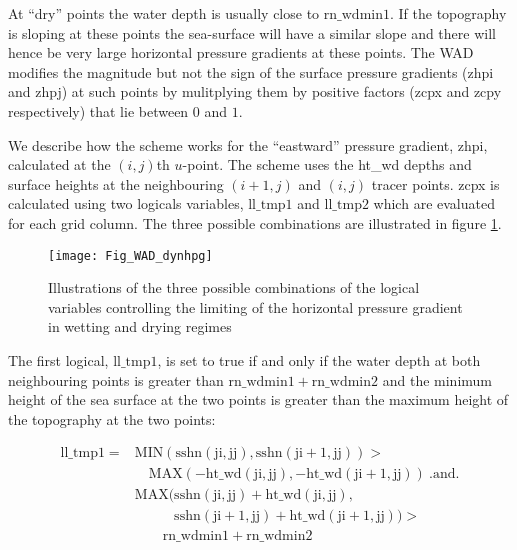 \documentclass[../main/NEMO_manual]{subfiles}
\begin{document}
At ``dry'' points the water depth is usually close to $\mathrm{rn\_wdmin1}$. If the
topography is sloping at these points the sea-surface will have a similar slope and there
will hence be very large horizontal pressure gradients at these points. The WAD modifies
the magnitude but not the sign of the surface pressure gradients (zhpi and zhpj) at such
points by mulitplying them by positive factors (zcpx and zcpy respectively) that lie
between $0$ and $1$.

We describe how the scheme works for the ``eastward'' pressure gradient, zhpi, calculated
at the $(i,j)$th $u$-point. The scheme uses the ht\_wd depths and surface heights at the
neighbouring $(i+1,j)$ and $(i,j)$ tracer points.  zcpx is calculated using two logicals
variables, $\mathrm{ll\_tmp1}$ and $\mathrm{ll\_tmp2}$ which are evaluated for each grid
column.  The three possible combinations are illustrated in figure \ref{Fig_WAD_dynhpg}.

\begin{figure}[!ht] \begin{center}
\texttt{[image: Fig\_WAD\_dynhpg]}
\caption{ \label{Fig_WAD_dynhpg}
Illustrations of the three possible combinations of the logical variables controlling the
limiting of the horizontal pressure gradient in wetting and drying regimes}
\end{center}\end{figure}

The first logical, $\mathrm{ll\_tmp1}$, is set to true if and only if the water depth at
both neighbouring points is greater than $\mathrm{rn\_wdmin1} + \mathrm{rn\_wdmin2}$ and
the minimum height of the sea surface at the two points is greater than the maximum height
of the topography at the two points:

\begin{equation} \label{dyn_ll_tmp1}
\begin{split}
\mathrm{ll\_tmp1}  = & \mathrm{MIN(sshn(ji,jj), sshn(ji+1,jj))} > \\
                     & \quad \mathrm{MAX(-ht\_wd(ji,jj), -ht\_wd(ji+1,jj))\  .and.} \\
& \mathrm{MAX(sshn(ji,jj) + ht\_wd(ji,jj),} \\
& \mathrm{\phantom{MAX(}sshn(ji+1,jj) + ht\_wd(ji+1,jj))} >\\
& \quad\quad\mathrm{rn\_wdmin1 + rn\_wdmin2 }
\end{split}
\end{equation}
\end{document}
